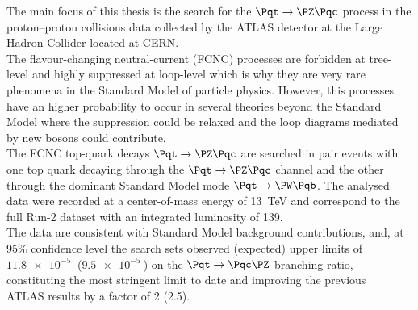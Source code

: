 \begin{adjustwidth}{1.5cm}{1.5cm}
	The main focus of this thesis is the search for the $\Pqt\rightarrow\PZ\Pqc$ process in the 
	proton–proton collisions data collected by the ATLAS detector at 
	the Large Hadron Collider located at CERN.\\		
	The flavour-changing neutral-current (FCNC) processes are forbidden at tree-level and 
	highly suppressed at loop-level which is why they are very rare phenomena in the Standard Model of particle physics.
	However, this processes have an higher probability to occur in several theories beyond the Standard Model where the 
	suppression could be relaxed and the loop diagrams mediated by new bosons could contribute.\\	
	The FCNC top-quark decays $\mathrm{\Pqt\rightarrow\PZ\Pqc}$ are searched in 
	\ttbar pair events with one top quark decaying through the $\mathrm{\Pqt\rightarrow\PZ\Pqc}$ channel 
	and the other through the dominant Standard Model mode $\mathrm{\Pqt\rightarrow\PW\Pqb}$.
	The analysed data were recorded at a center-of-mass energy of \SI{13}{\TeV} and correspond to the full Run-2 dataset 
	with an integrated luminosity of \SI{139}{\ifb}.\\
	The data are consistent with Standard Model background contributions, and, at 95\% confidence level the search sets observed (expected) upper limits of $\mathrm{\SI{11.8e-5}{}}$ ($\mathrm{\SI{9.5e-5}{}}$) on the $\mathrm{\Pqt\rightarrow\Pqc\PZ}$ branching ratio, constituting the most stringent limit to date and improving the previous\\ ATLAS results by a factor of 2 (2.5).
		
\end{adjustwidth}



